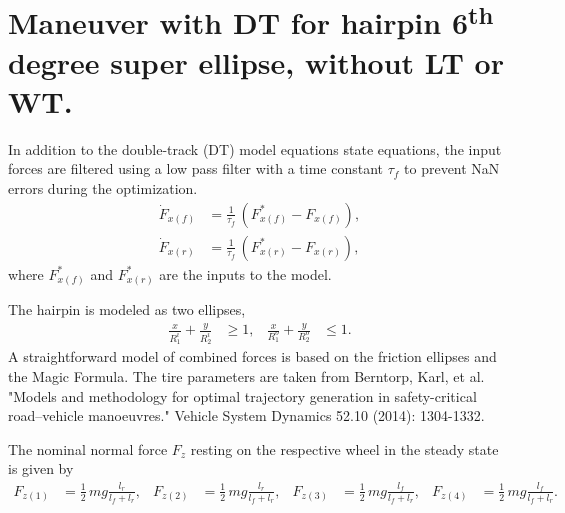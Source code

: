 \chapter[Double-Track Maneuver Optimization]{Maneuver with DT for hairpin 6\textsuperscript{th} degree super ellipse, without LT or WT.}

In addition to the double-track (DT) model equations state equations,
the input forces are filtered using a low pass filter with a time constant $\tau_f$ to prevent NaN errors during the optimization.
\begin{align}
    \dot F_{x(f)} &= \frac{1}{\tau_f}\,\left(F_{x(f)}^* - F_{x(f)}\right),\\
    \dot F_{x(r)} &= \frac{1}{\tau_f}\,\left(F_{x(r)}^* - F_{x(r)}\right),
\end{align}
where $F_{x(f)}^*$ and $F_{x(r)}^*$ are the inputs to the model.

The hairpin is modeled as two ellipses,
\begin{align}
    \frac{x}{R_1^i} + \frac{y}{R_2^i} & \geq 1, & \frac{x}{R_1^o} + \frac{y}{R_2^o} & \leq 1.
\end{align}
A straightforward model of combined forces is based on the friction ellipses and the Magic Formula. The tire parameters are taken from Berntorp, Karl, et al. "Models and methodology for optimal trajectory generation in safety-critical road–vehicle manoeuvres." Vehicle System Dynamics 52.10 (2014): 1304-1332.

The nominal normal force $F_z$ resting on the respective wheel in the steady state is given by
\begin{align}
    F_{z(1)} &= \frac{1}{2}\,mg\frac{l_r}{l_f+l_r}, & F_{z(2)} &= \frac{1}{2}\,mg\frac{l_r}{l_f+l_r}, & F_{z(3)} &= \frac{1}{2}\,mg\frac{l_f}{l_f+l_r}, & F_{z(4)} &= \frac{1}{2}\,mg\frac{l_f}{l_f+l_r}.
\end{align}

